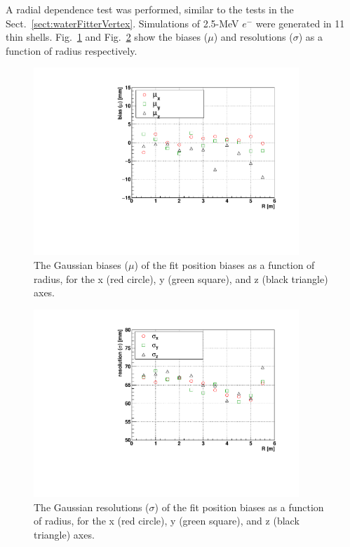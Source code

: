 A radial dependence test was performed, similar to the tests in the Sect.~\ref{sect:waterFitterVertex}.
Simulations of 2.5-MeV $e^-$ were generated in 11 thin shells. Fig.~\ref{fig:scintShellVsBias} and Fig.~\ref{fig:scintShellVsResol} show the biases ($\mu$) and resolutions ($\sigma$) as a function of radius respectively. 

\begin{figure}[!htb]
	\centering
	\includegraphics[width=10cm]{shellTestScintFitter_RvsBias.pdf}
	\caption[The Gaussian biases ($\mu$) of the \texttt{MP scint fitter} fit position biases as a function of radius, for the x, y, and z axes.]{The Gaussian biases ($\mu$) of the fit position biases as a function of radius, for the x (red circle), y (green square), and z (black triangle) axes.}
	\label{fig:scintShellVsBias}
\end{figure}

\begin{figure}[!htb]
	\centering
	\includegraphics[width=10cm]{shellTestScintFitter_RvsResol.pdf}
	\caption[The Gaussian resolutions ($\sigma$) of the \texttt{MP scint fitter} fit position biases as a function of radius, for the x, y, and z axes.]{The Gaussian resolutions ($\sigma$) of the fit position biases as a function of radius, for the x (red circle), y (green square), and z (black triangle) axes.}
	\label{fig:scintShellVsResol}
\end{figure}

